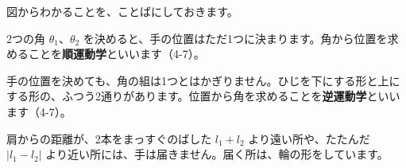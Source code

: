 \begin{phmodel}[2本の腕]
\end{phmodel}
図からわかることを、ことばにしておきます。
\begin{enumerate}[label={\bkcircled[bkBlue]{\arabic*}}, leftmargin=2.4\zw, itemsep=1pt, topsep=2pt]
\item 2つの角 $\theta_1$、$\theta_2$ を決めると、手の位置はただ1つに決まります。角から位置を求めることを\textbf{順運動学}といいます（4-7）。
\item 手の位置を決めても、角の組は1つとはかぎりません。ひじを下にする形と上にする形の、ふつう2通りがあります。位置から角を求めることを\textbf{逆運動学}といいます（4-7）。
\item 肩からの距離が、2本をまっすぐのばした $l_1+l_2$ より遠い所や、たたんだ $|l_1-l_2|$ より近い所には、手は届きません。届く所は、輪の形をしています。
\end{enumerate}




